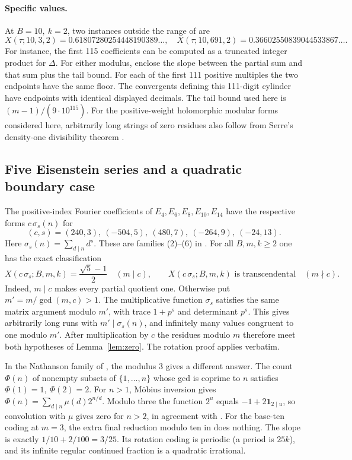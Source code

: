 \documentclass[11pt,a4paper]{article}
\begin{document}
\paragraph{Specific values.}
At \(B=10,\ k=2\), two instances outside the range of \cite[Thm.~1.11(1)]{cm} are
\[
 X(\tau;10,3,2)=0.61807280254448190389\ldots,\quad
 X(\tau;10,691,2)=0.36602550839044533867\ldots .
\]
For instance, the first 115 coefficients can be computed as a truncated integer product for \(\Delta\). For either modulus, enclose the slope between the partial sum and that sum plus the tail bound. For each of the first 111 positive multiples the two endpoints have the same floor. The convergents defining this 111-digit cylinder have endpoints with identical displayed decimals. The tail bound used here is $(m-1)/(9\cdot10^{115})$. For the positive-weight holomorphic modular forms considered here, arbitrarily long strings of zero residues also follow from Serre's density-one divisibility theorem \cite{serre}. 

\subsection{Five Eisenstein series and a quadratic boundary case}
The positive-index Fourier coefficients of \(E_4,E_6,E_8,E_{10},E_{14}\) have the respective forms \(c\,\sigma_s(n)\) for
\[
 (c,s)=(240,3),\ (-504,5),\ (480,7),\ (-264,9),\ (-24,13).
\]
Here \(\sigma_s(n)=\sum_{d\mid n}d^s\). These are families (2)--(6) in \cite[Thm.~1.11]{cm}. For all \(B,m,k\ge2\) one has the exact classification
\[
 X(c\,\sigma_s;B,m,k)=\frac{\sqrt5-1}{2}\quad(m\mid c),\qquad
 X(c\,\sigma_s;B,m,k)\text{ is transcendental}\quad(m\nmid c).
\]
Indeed, \(m\mid c\) makes every partial quotient one. Otherwise put \(m'=m/\gcd(m,c)>1\). The multiplicative function \(\sigma_s\) satisfies the same matrix argument modulo \(m'\), with trace \(1+p^s\) and determinant \(p^s\). This gives arbitrarily long runs with \(m'\mid\sigma_s(n)\), and infinitely many values congruent to one modulo \(m'\). After multiplication by \(c\) the residues modulo \(m\) therefore meet both hypotheses of Lemma~\ref{lem:zero}. The rotation proof applies verbatim.

In the Nathanson family of \cite[Thm.~1.11(7)]{cm}, the modulus \(3\) gives a different answer. The count \(\Phi(n)\) of nonempty subsets of \(\{1,\dots,n\}\) whose gcd is coprime to \(n\) satisfies \(\Phi(1)=1,\ \Phi(2)=2\). For \(n>1\), Möbius inversion gives \(\Phi(n)=\sum_{d\mid n}\mu(d)2^{n/d}\). Modulo three the function \(2^u\) equals \(-1+2\mathbf 1_{2\mid u}\), so convolution with \(\mu\) gives zero for \(n>2\), in agreement with \cite{tang}. For the base-ten coding at \(m=3\), the extra final reduction modulo ten in \cite{cm} does nothing. The slope is exactly \(1/10+2/100=3/25\). Its rotation coding is periodic (a period is \(25k\)), and its infinite regular continued fraction is a quadratic irrational.
\end{document}
